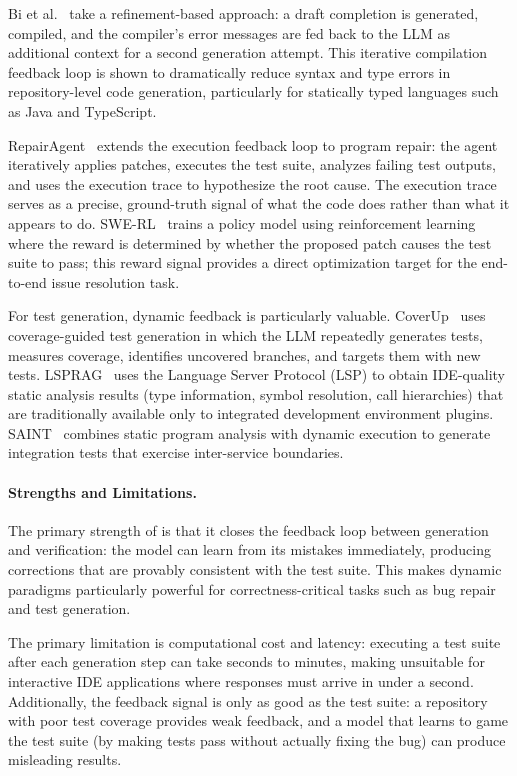 Bi et al.~\cite{bi2024iterative} take a refinement-based approach: a draft completion is
generated, compiled, and the compiler's error messages are fed back to the LLM as additional
context for a second generation attempt. This iterative compilation feedback loop is shown
to dramatically reduce syntax and type errors in repository-level code generation, particularly
for statically typed languages such as Java and TypeScript.

RepairAgent~\cite{bouzenia2025repairagent} extends the execution feedback loop to program
repair: the agent iteratively applies patches, executes the test suite, analyzes failing test
outputs, and uses the execution trace to hypothesize the root cause. The execution trace serves
as a precise, ground-truth signal of what the code does rather than what it appears to do.
SWE-RL~\cite{wei2025swerl} trains a policy model using reinforcement learning where the reward
is determined by whether the proposed patch causes the test suite to pass; this reward signal
provides a direct optimization target for the end-to-end issue resolution task.

For test generation, dynamic feedback is particularly valuable. CoverUp~\cite{altmayer2025coverup}
uses coverage-guided test generation in which the LLM repeatedly generates tests, measures
coverage, identifies uncovered branches, and targets them with new tests. LSPRAG~\cite{go2025lsprag}
uses the Language Server Protocol (LSP) to obtain IDE-quality static analysis results (type
information, symbol resolution, call hierarchies) that are traditionally available only to
integrated development environment plugins. SAINT~\cite{pan2025saint} combines static program
analysis with dynamic execution to generate integration tests that exercise inter-service
boundaries.

\paragraph{Strengths and Limitations.}
The primary strength of  is that it closes the feedback loop between generation and
verification: the model can learn from its mistakes immediately, producing corrections that are
provably consistent with the test suite. This makes dynamic paradigms particularly powerful
for correctness-critical tasks such as bug repair and test generation.

The primary limitation is computational cost and latency: executing a test suite after each
generation step can take seconds to minutes, making  unsuitable for interactive IDE
applications where responses must arrive in under a second. Additionally, the feedback signal
is only as good as the test suite: a repository with poor test coverage provides weak feedback,
and a model that learns to game the test suite (by making tests pass without actually fixing
the bug) can produce misleading results.

